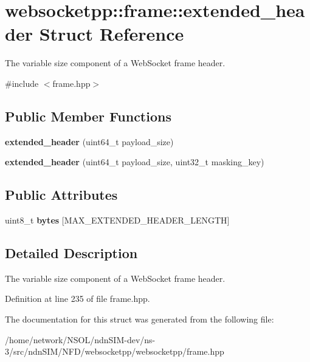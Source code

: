 \hypertarget{structwebsocketpp_1_1frame_1_1extended__header}{}\section{websocketpp\+:\+:frame\+:\+:extended\+\_\+header Struct Reference}
\label{structwebsocketpp_1_1frame_1_1extended__header}


The variable size component of a Web\+Socket frame header.  




{\ttfamily \#include $<$frame.\+hpp$>$}

\subsection*{Public Member Functions}
\begin{DoxyCompactItemize}
\item 
{\bfseries extended\+\_\+header} (uint64\+\_\+t payload\+\_\+size)\hypertarget{structwebsocketpp_1_1frame_1_1extended__header_a0fdbc1aaf81b56d61cc962fd724d3ffa}{}\label{structwebsocketpp_1_1frame_1_1extended__header_a0fdbc1aaf81b56d61cc962fd724d3ffa}

\item 
{\bfseries extended\+\_\+header} (uint64\+\_\+t payload\+\_\+size, uint32\+\_\+t masking\+\_\+key)\hypertarget{structwebsocketpp_1_1frame_1_1extended__header_af94b7d3a232117abfbd2b876025ab451}{}\label{structwebsocketpp_1_1frame_1_1extended__header_af94b7d3a232117abfbd2b876025ab451}

\end{DoxyCompactItemize}
\subsection*{Public Attributes}
\begin{DoxyCompactItemize}
\item 
uint8\+\_\+t {\bfseries bytes} \mbox{[}M\+A\+X\+\_\+\+E\+X\+T\+E\+N\+D\+E\+D\+\_\+\+H\+E\+A\+D\+E\+R\+\_\+\+L\+E\+N\+G\+TH\mbox{]}\hypertarget{structwebsocketpp_1_1frame_1_1extended__header_a64507c32b568d0894b2bf3a2513debd1}{}\label{structwebsocketpp_1_1frame_1_1extended__header_a64507c32b568d0894b2bf3a2513debd1}

\end{DoxyCompactItemize}


\subsection{Detailed Description}
The variable size component of a Web\+Socket frame header. 

Definition at line 235 of file frame.\+hpp.



The documentation for this struct was generated from the following file\+:\begin{DoxyCompactItemize}
\item 
/home/network/\+N\+S\+O\+L/ndn\+S\+I\+M-\/dev/ns-\/3/src/ndn\+S\+I\+M/\+N\+F\+D/websocketpp/websocketpp/frame.\+hpp\end{DoxyCompactItemize}
